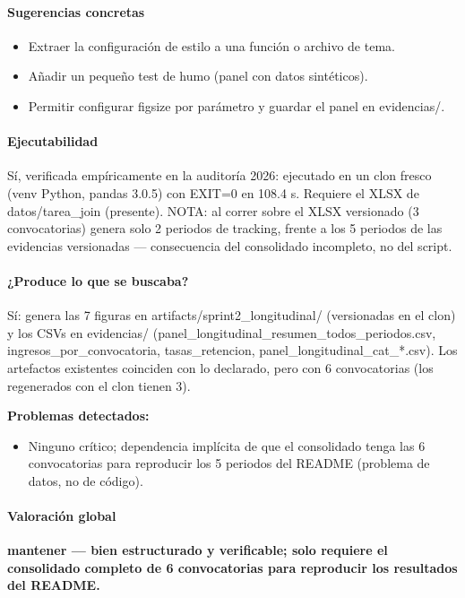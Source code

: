 \paragraph{Sugerencias concretas}
\begin{itemize}
  \item Extraer la configuración de estilo a una función o archivo de tema.
  \item Añadir un pequeño test de humo (panel con datos sintéticos).
  \item Permitir configurar figsize por parámetro y guardar el panel en evidencias/.
\end{itemize}

\paragraph{Ejecutabilidad}
Sí, verificada empíricamente en la auditoría 2026: ejecutado en un clon fresco (venv Python, pandas 3.0.5) con EXIT=0 en 108.4 s. Requiere el XLSX de datos/tarea\_join (presente). NOTA: al correr sobre el XLSX versionado (3 convocatorias) genera solo 2 periodos de tracking, frente a los 5 periodos de las evidencias versionadas --- consecuencia del consolidado incompleto, no del script.

\paragraph{¿Produce lo que se buscaba?}
Sí: genera las 7 figuras en artifacts/sprint2\_longitudinal/ (versionadas en el clon) y los CSVs en evidencias/ (panel\_longitudinal\_resumen\_todos\_periodos.csv, ingresos\_por\_convocatoria, tasas\_retencion, panel\_longitudinal\_cat\_*.csv). Los artefactos existentes coinciden con lo declarado, pero con 6 convocatorias (los regenerados con el clon tienen 3).

\begin{tcolorbox}[riesgo]
\textbf{Problemas detectados:}
\begin{itemize}
  \item Ninguno crítico; dependencia implícita de que el consolidado tenga las 6 convocatorias para reproducir los 5 periodos del README (problema de datos, no de código).
\end{itemize}
\end{tcolorbox}

\paragraph{Valoración global}
\textbf{mantener --- bien estructurado y verificable; solo requiere el consolidado completo de 6 convocatorias para reproducir los resultados del README.}


